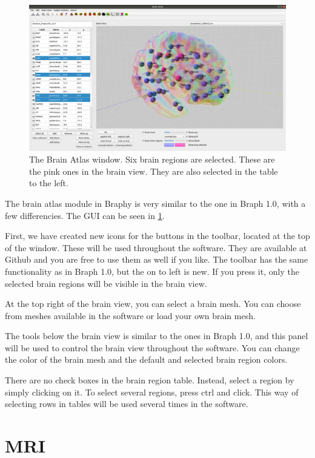 \documentclass{article}
\begin{document}
\begin{figure}[h]
    \centering
    \includegraphics[width=\linewidth]{brain_atlas.png}
    \caption{The Brain Atlas window. Six brain regions are selected. These are the pink ones in the brain view. They are also selected in the table to the left.}
    \label{fig:brain_atlas}
\end{figure}

The brain atlas module in Braphy is very similar to the one in Braph 1.0, with a few differencies. The GUI can be seen in \cref{fig:brain_atlas}.

First, we have created new icons for the buttons in the toolbar, located at the top of the window. These will be used throughout the software. They are available at Github and you are free to use them as well if you like. The toolbar has the same functionality as in Braph 1.0, but the on to left is new. If you press it, only the selected brain regions will be visible in the brain view.

At the top right of the brain view, you can select a brain mesh. You can choose from meshes available in the software or load your own brain mesh.

The tools below the brain view is similar to the ones in Braph 1.0, and this panel will be used to control the brain view throughout the software. You can change the color of the brain mesh and the default and selected brain region colors.

There are no check boxes in the brain region table. Instead, select a region by simply clicking on it. To select several regions, press ctrl and click. This way of selecting rows in tables will be used several times in the software.

\section{MRI}
\end{document}
